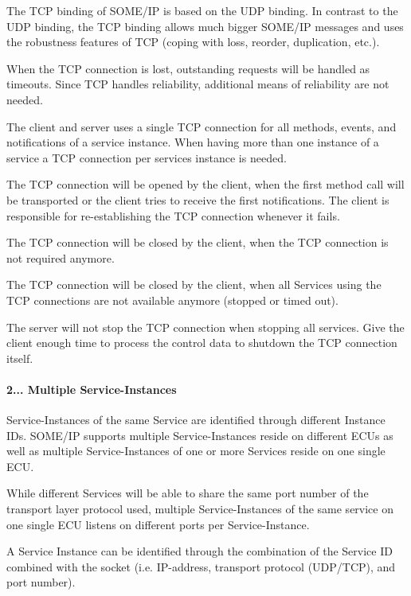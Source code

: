 \begin{DoxyItemize}
\item The T\+CP binding of S\+O\+M\+E/\+IP is based on the U\+DP binding. In contrast to the U\+DP binding, the T\+CP binding allows much bigger S\+O\+M\+E/\+IP messages and uses the robustness features of T\+CP (coping with loss, reorder, duplication, etc.).
\item When the T\+CP connection is lost, outstanding requests will be handled as timeouts. Since T\+CP handles reliability, additional means of reliability are not needed.
\item The client and server uses a single T\+CP connection for all methods, events, and notifications of a service instance. When having more than one instance of a service a T\+CP connection per services instance is needed.
\item The T\+CP connection will be opened by the client, when the first method call will be transported or the client tries to receive the first notifications. The client is responsible for re-\/establishing the T\+CP connection whenever it fails.
\item The T\+CP connection will be closed by the client, when the T\+CP connection is not required anymore.
\item The T\+CP connection will be closed by the client, when all Services using the T\+CP connections are not available anymore (stopped or timed out).
\item The server will not stop the T\+CP connection when stopping all services. Give the client enough time to process the control data to shutdown the T\+CP connection itself.
\end{DoxyItemize}

\paragraph*{2... Multiple Service-\/\+Instances}


\begin{DoxyItemize}
\item Service-\/\+Instances of the same Service are identified through different Instance I\+Ds. S\+O\+M\+E/\+IP supports multiple Service-\/\+Instances reside on different E\+C\+Us as well as multiple Service-\/\+Instances of one or more Services reside on one single E\+CU.
\item While different Services will be able to share the same port number of the transport layer protocol used, multiple Service-\/\+Instances of the same service on one single E\+CU listens on different ports per Service-\/\+Instance.
\item A Service Instance can be identified through the combination of the Service ID combined with the socket (i.\+e. I\+P-\/address, transport protocol (U\+D\+P/\+T\+CP), and port number).
\end{DoxyItemize}

